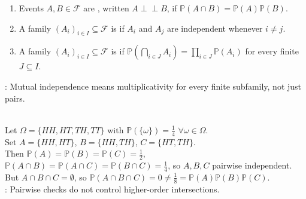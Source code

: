 \begin{definition} \label{def:independent-events-and-families} 
\begin{enumerate}[label=(\roman*)]
\setlength{\itemsep}{0pt}
\item Events $A,B\in\mathcal{F}$ are , written $A\perp\!\!\!\perp B$, if $\mathbb{P}(A\cap B)=\mathbb{P}(A)\mathbb{P}(B)$.
\item A family $(A_i)_{i\in I}\subseteq\mathcal{F}$ is  if $A_i$ and $A_j$ are independent whenever $i\neq j$.
\item A family $(A_i)_{i\in I}\subseteq\mathcal{F}$ is  if $\mathbb{P}(\bigcap\limits_{i\in J}A_i)=\prod\limits_{i\in J}\mathbb{P}(A_i)$ for every finite $J\subseteq I$.
\end{enumerate}
: Mutual independence means multiplicativity for every finite subfamily, not just pairs.
\end{definition}

\begin{example} \label{ex:pairwise-not-mutual-independence-two-tosses} \\
Let $\Omega=\{HH,HT,TH,TT\}$ with $\mathbb{P}(\{\omega\})=\frac{1}{4}$ $\forall \omega\in\Omega$.\\
Set $A=\{HH,HT\}$, $B=\{HH,TH\}$, $C=\{HT,TH\}$.\\
Then $\mathbb{P}(A)=\mathbb{P}(B)=\mathbb{P}(C)=\frac{1}{2}$, $\mathbb{P}(A\cap B)=\mathbb{P}(A\cap C)=\mathbb{P}(B\cap C)=\frac{1}{4}$, so $A,B,C$ pairwise independent.\\
But $A\cap B\cap C=\emptyset$, so $\mathbb{P}(A\cap B\cap C)=0\neq \frac{1}{8}=\mathbb{P}(A)\mathbb{P}(B)\mathbb{P}(C)$.\\
: Pairwise checks do not control higher-order intersections.
\end{example}

